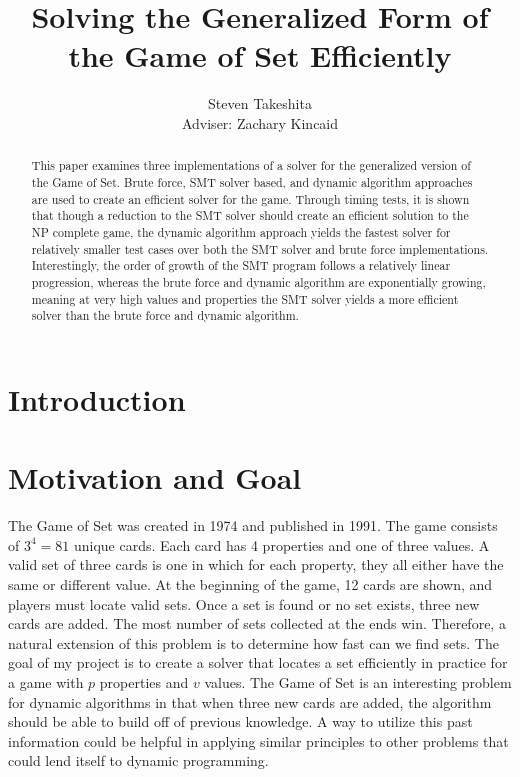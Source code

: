 \documentclass[pageno]{jpaper}
\begin{document}
\title{Solving the Generalized Form of the Game of Set Efficiently}

\author{Steven Takeshita\\Adviser: Zachary Kincaid}

\date{}
\maketitle

\thispagestyle{empty}
\doublespacing
\begin{abstract}
This paper examines three implementations of a solver for the generalized version of the Game of Set. Brute force, SMT solver based, and dynamic algorithm approaches are used to create an efficient solver for the game. Through timing tests, it is shown that though a reduction to the SMT solver should create an efficient solution to the NP complete game, the dynamic algorithm approach yields the fastest solver for relatively smaller test cases over both the SMT solver and brute force implementations. Interestingly, the order of growth of the SMT program follows a relatively linear progression, whereas the brute force and dynamic algorithm are exponentially growing, meaning at very high values and properties the SMT solver yields a more efficient solver than the brute force and dynamic algorithm. 
\end{abstract}

\section{Introduction}



\section{Motivation and Goal}

The Game of Set was created in 1974 and published in 1991. The game consists of $3^4 = 81$ unique cards. Each card has 4 properties and one of three values. A valid set of three cards is one in which for each property, they all either have the same or different value. At the beginning of the game, 12 cards are shown, and players must locate valid sets. Once a set is found or no set exists, three new cards are added. The most number of sets collected at the ends win. Therefore, a natural extension of this problem is to determine how fast can we find sets. The goal of my project is to create a solver that locates a set efficiently in practice for a game with $p$ properties and $v$ values. The Game of Set is an interesting problem for dynamic algorithms in that when three new cards are added, the algorithm should be able to build off of previous knowledge. A way to utilize this past information could be helpful in applying similar principles to other problems that could lend itself to dynamic programming. 
\end{document}
